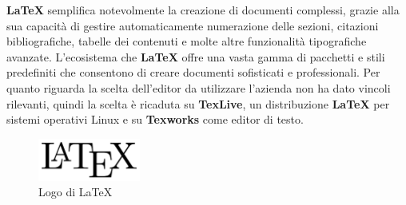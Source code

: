 \noindent \textbf{LaTeX} semplifica notevolmente la creazione di documenti complessi, grazie alla sua capacità di gestire automaticamente numerazione delle sezioni, citazioni bibliografiche, tabelle dei contenuti e molte altre funzionalità tipografiche avanzate.
L'ecosistema che \textbf{LaTeX} offre una vasta gamma di pacchetti e stili predefiniti che consentono di creare documenti sofisticati e professionali.
Per quanto riguarda la scelta dell'editor da utilizzare l'azienda non ha dato vincoli rilevanti, quindi la scelta è ricaduta su \textbf{TexLive}, un distribuzione \textbf{LaTeX} per sistemi operativi Linux e su \textbf{Texworks} come editor di testo.
\begin{figure}[hpp]
    \centering
    \includegraphics[width=0.3\textwidth]{images/tecnologie/logo_latex.png}
    \caption{Logo di LaTeX}
    \label{fig:latex}
\end{figure}

\newpage
\pagestyle{empty}
\null %
\newpage